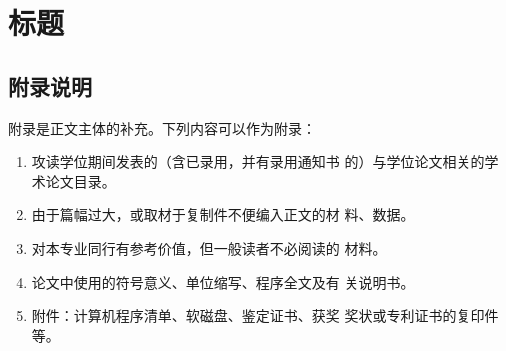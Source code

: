 \chapter{标题}
\section{附录说明}
附录是正文主体的补充。下列内容可以作为附录：
\begin{enumerate}
    \item 攻读学位期间发表的（含已录用，并有录用通知书
    的）与学位论文相关的学术论文目录。
    \item 由于篇幅过大，或取材于复制件不便编入正文的材
    料、数据。
    \item 对本专业同行有参考价值，但一般读者不必阅读的
    材料。
    \item 论文中使用的符号意义、单位缩写、程序全文及有
    关说明书。
    \item 附件：计算机程序清单、软磁盘、鉴定证书、获奖
    奖状或专利证书的复印件等。
\end{enumerate}
